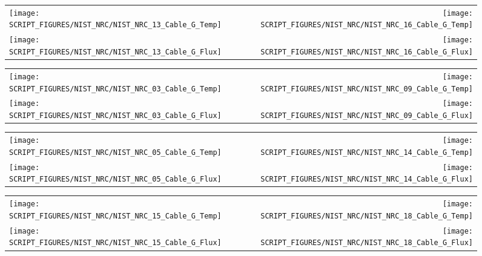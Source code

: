 \begin{figure}[!ht]
\begin{tabular*}{\textwidth}{l@{\extracolsep{\fill}}r}
\texttt{[image: SCRIPT\_FIGURES/NIST\_NRC/NIST\_NRC\_13\_Cable\_G\_Temp]} &
\texttt{[image: SCRIPT\_FIGURES/NIST\_NRC/NIST\_NRC\_16\_Cable\_G\_Temp]} \\
\texttt{[image: SCRIPT\_FIGURES/NIST\_NRC/NIST\_NRC\_13\_Cable\_G\_Flux]} &
\texttt{[image: SCRIPT\_FIGURES/NIST\_NRC/NIST\_NRC\_16\_Cable\_G\_Flux]}
\end{tabular*}
\label{NIST_NRC_G_13_and_16}
\end{figure}

\clearpage

\begin{figure}[!ht]
\begin{tabular*}{\textwidth}{l@{\extracolsep{\fill}}r}
\texttt{[image: SCRIPT\_FIGURES/NIST\_NRC/NIST\_NRC\_03\_Cable\_G\_Temp]} &
\texttt{[image: SCRIPT\_FIGURES/NIST\_NRC/NIST\_NRC\_09\_Cable\_G\_Temp]} \\
\texttt{[image: SCRIPT\_FIGURES/NIST\_NRC/NIST\_NRC\_03\_Cable\_G\_Flux]} &
\texttt{[image: SCRIPT\_FIGURES/NIST\_NRC/NIST\_NRC\_09\_Cable\_G\_Flux]}
\end{tabular*}
\label{NIST_NRC_G_3_and_9}
\end{figure}

\begin{figure}[!ht]
\begin{tabular*}{\textwidth}{l@{\extracolsep{\fill}}r}
\texttt{[image: SCRIPT\_FIGURES/NIST\_NRC/NIST\_NRC\_05\_Cable\_G\_Temp]} &
\texttt{[image: SCRIPT\_FIGURES/NIST\_NRC/NIST\_NRC\_14\_Cable\_G\_Temp]} \\
\texttt{[image: SCRIPT\_FIGURES/NIST\_NRC/NIST\_NRC\_05\_Cable\_G\_Flux]} &
\texttt{[image: SCRIPT\_FIGURES/NIST\_NRC/NIST\_NRC\_14\_Cable\_G\_Flux]}
\end{tabular*}
\label{NIST_NRC_G_5_and_14}
\end{figure}

\clearpage

\begin{figure}[!ht]
\begin{tabular*}{\textwidth}{l@{\extracolsep{\fill}}r}
\texttt{[image: SCRIPT\_FIGURES/NIST\_NRC/NIST\_NRC\_15\_Cable\_G\_Temp]} &
\texttt{[image: SCRIPT\_FIGURES/NIST\_NRC/NIST\_NRC\_18\_Cable\_G\_Temp]} \\
\texttt{[image: SCRIPT\_FIGURES/NIST\_NRC/NIST\_NRC\_15\_Cable\_G\_Flux]} &
\texttt{[image: SCRIPT\_FIGURES/NIST\_NRC/NIST\_NRC\_18\_Cable\_G\_Flux]}
\end{tabular*}
\label{NIST_NRC_G_15_and_18}
\end{figure}


